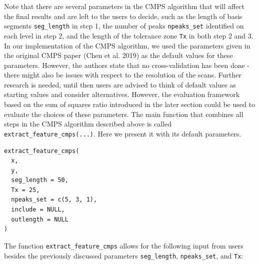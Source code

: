 Note that there are several parameters in the CMPS algorithm that will affect the final results and are left to the users to decide, such as the length of basis segments \texttt{seg\_length} in step 1, the number of peaks \texttt{npeaks\_set} identified on each level in step 2, and the length of the tolerance zone \texttt{Tx} in both step 2 and 3.
In our implementation of the CMPS algorithm, we used the parameters given in the original CMPS paper (Chen et al. 2019) as the default values for these parameters.
However, the authors state that no cross-validation has been done - there might also be issues with respect to the resolution of the scans.
Further research is needed, until then users are advised to think of default values as starting values and consider alternatives. However, the evaluation framework based on the sum of squares ratio introduced in the later section could be used to evaluate the choices of these parameters.
The main function that combines all steps in the CMPS algorithm described above is called \texttt{extract\_feature\_cmps(...)}.
Here we present it with its default parameters.

\begin{verbatim}
extract_feature_cmps(
  x,
  y,
  seg_length = 50,
  Tx = 25,
  npeaks_set = c(5, 3, 1),
  include = NULL,
  outlength = NULL
)
\end{verbatim}

The function \texttt{extract\_feature\_cmps} allows for the following input from users besides the previously discussed parameters \texttt{seg\_length}, \texttt{npeaks\_set}, and \texttt{Tx}:

